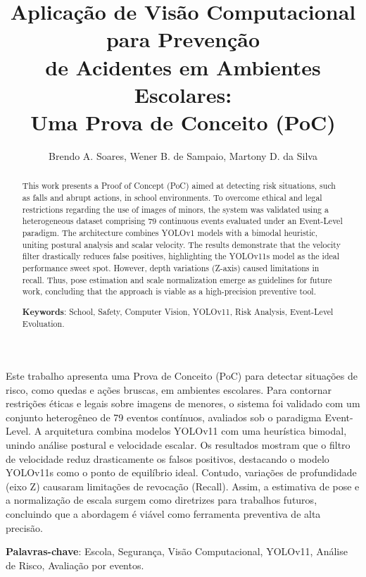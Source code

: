 \documentclass[12pt]{article}
\title{Aplicação de Visão Computacional para Prevenção\\ de Acidentes em Ambientes Escolares:\\ Uma Prova de Conceito (PoC)}
\author{Brendo A. Soares\inst{1}, Wener B. de Sampaio\inst{2}, Martony D. da Silva\inst{3} }
\begin{document}
 

\maketitle

\begin{abstract}
  This work presents a Proof of Concept (PoC) aimed at detecting risk situations,
  such as falls and abrupt actions, in school environments. To overcome ethical
  and legal restrictions regarding the use of images of minors, the system was
  validated using a heterogeneous dataset comprising 79 continuous events
  evaluated under an Event-Level paradigm. The architecture combines YOLOv1
  models with a bimodal heuristic, uniting postural analysis and scalar velocity.
  The results demonstrate that the velocity filter drastically reduces false
  positives, highlighting the YOLOv11s model as the ideal performance sweet spot.
  However, depth variations (Z-axis) caused limitations in recall. Thus, pose
  estimation and scale normalization emerge as guidelines for future work,
  concluding that the approach is viable as a high-precision preventive tool.

\vspace{\baselineskip}
\noindent
\textbf{Keywords}: School, Safety, Computer Vision, YOLOv11, Risk Analysis, Event-Level Evoluation.
\end{abstract}
     
\begin{resumo}
  Este trabalho apresenta uma Prova de Conceito (PoC) para detectar situações de risco,
  como quedas e ações bruscas, em ambientes escolares. Para contornar restrições éticas
  e legais sobre imagens de menores, o sistema foi validado com um conjunto heterogêneo
  de 79 eventos contínuos, avaliados sob o paradigma Event-Level. A arquitetura combina
  modelos YOLOv11 com uma heurística bimodal, unindo análise postural e velocidade escalar.
  Os resultados mostram que o filtro de velocidade reduz drasticamente os falsos positivos,
  destacando o modelo YOLOv11s como o ponto de equilíbrio ideal. Contudo, variações de
  profundidade (eixo Z) causaram limitações de revocação (Recall). Assim, a estimativa
  de pose e a normalização de escala surgem como diretrizes para trabalhos futuros,
  concluindo que a abordagem é viável como ferramenta preventiva de alta precisão.

\vspace{\baselineskip}
\noindent
\textbf{Palavras-chave}: Escola, Segurança, Visão Computacional, YOLOv11, Análise de Risco, Avaliação por eventos.
\end{resumo}
\end{document}
